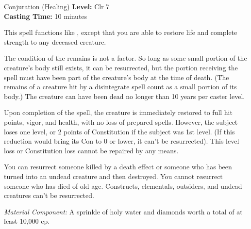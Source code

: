 {Conjuration (Healing)}
{
	\textbf{Level:}
	Clr 7\\
	\textbf{Casting Time:}
	10 minutes\\
}
{
	This spell functions like , except that you are able to restore life and complete strength to any deceased creature.

	The condition of the remains is not a factor. So long as some small portion of the creature's body still exists, it can be resurrected, but the portion receiving the spell must have been part of the creature's body at the time of death. (The remains of a creature hit by a disintegrate spell count as a small portion of its body.) The creature can have been dead no longer than 10 years per caster level.

	Upon completion of the spell, the creature is immediately restored to full hit points, vigor, and health, with no loss of prepared spells. However, the subject loses one level, or 2 points of Constitution if the subject was 1st level. (If this reduction would bring its Con to 0 or lower, it can't be resurrected). This level loss or Constitution loss cannot be repaired by any means.

	You can resurrect someone killed by a death effect or someone who has been turned into an undead creature and then destroyed. You cannot resurrect someone who has died of old age. Constructs, elementals, outsiders, and undead creatures can't be resurrected.

	\textit{Material Component:}
	A sprinkle of holy water and diamonds worth a total of at least 10,000 cp.

}
